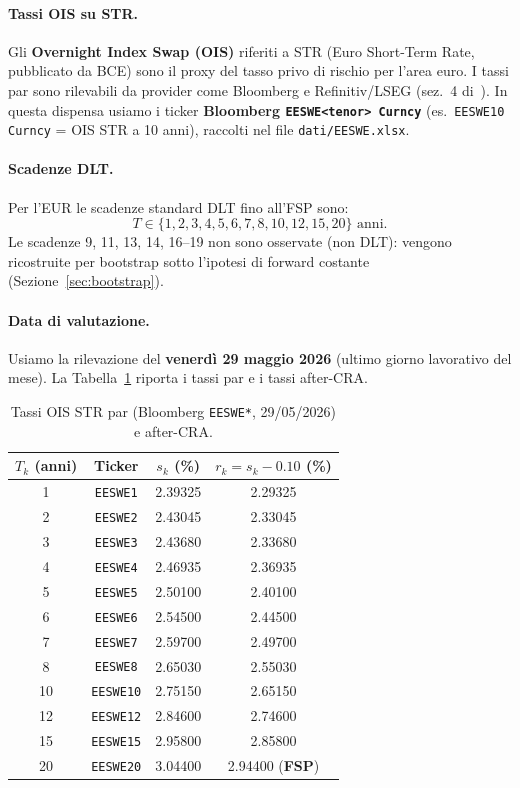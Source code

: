 \documentclass[11pt,a4paper]{article}
\theoremstyle{plain}
\theoremstyle{definition}
\theoremstyle{remark}
\newcommand{\estr}{\texteuro{}STR}
\begin{document}
\paragraph{Tassi OIS su \estr{}.}
Gli \textbf{Overnight Index Swap (OIS)} riferiti a \estr{} (Euro Short-Term Rate,
pubblicato da BCE) sono il proxy del tasso privo di rischio per l'area euro. I tassi par
sono rilevabili da provider come Bloomberg e Refinitiv/LSEG (sez.~4 di~\cite{eiopa2026}).
In questa dispensa usiamo i ticker \textbf{Bloomberg \texttt{EESWE<tenor> Curncy}}
(es.\ \texttt{EESWE10 Curncy} = OIS \estr{} a 10 anni), raccolti nel file
\texttt{dati/EESWE.xlsx}.

\paragraph{Scadenze DLT.}
Per l'EUR le scadenze standard DLT fino all'FSP sono:
\[
  T \in \{1, 2, 3, 4, 5, 6, 7, 8, 10, 12, 15, 20\} \text{ anni}.
\]
Le scadenze 9, 11, 13, 14, 16--19 non sono osservate (non DLT): vengono ricostruite per
bootstrap sotto l'ipotesi di forward costante (Sezione~\ref{sec:bootstrap}).

\paragraph{Data di valutazione.}
Usiamo la rilevazione del \textbf{venerd\`i 29 maggio 2026} (ultimo giorno lavorativo
del mese). La Tabella~\ref{tab:ois_eur} riporta i tassi par e i tassi after-CRA.

\begin{table}[H]
\centering\small
\caption{Tassi OIS \estr{} par (Bloomberg \texttt{EESWE*}, 29/05/2026) e after-CRA.}
\label{tab:ois_eur}
\begin{tabular}{cccc}
\toprule
$T_k$ (anni) & Ticker & $s_k$ (\%) & $r_k = s_k - 0.10$ (\%) \\
\midrule
\rowcolor{rowtint}1  & \texttt{EESWE1}  & 2.39325 & 2.29325 \\
2  & \texttt{EESWE2}  & 2.43045 & 2.33045 \\
\rowcolor{rowtint}3  & \texttt{EESWE3}  & 2.43680 & 2.33680 \\
4  & \texttt{EESWE4}  & 2.46935 & 2.36935 \\
\rowcolor{rowtint}5  & \texttt{EESWE5}  & 2.50100 & 2.40100 \\
6  & \texttt{EESWE6}  & 2.54500 & 2.44500 \\
\rowcolor{rowtint}7  & \texttt{EESWE7}  & 2.59700 & 2.49700 \\
8  & \texttt{EESWE8}  & 2.65030 & 2.55030 \\
\rowcolor{rowtint}10 & \texttt{EESWE10} & 2.75150 & 2.65150 \\
12 & \texttt{EESWE12} & 2.84600 & 2.74600 \\
\rowcolor{rowtint}15 & \texttt{EESWE15} & 2.95800 & 2.85800 \\
20 & \texttt{EESWE20} & 3.04400 & 2.94400 \quad(\textbf{FSP})\\
\bottomrule
\end{tabular}
\end{table}
\end{document}
